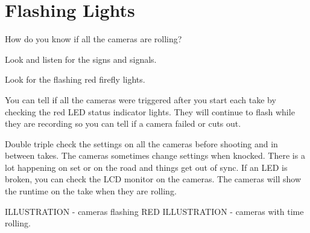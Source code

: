 \chapter{Flashing Lights}
\pagecolor{white}
\label{chap:16}
\begin{fullwidth}


\problem

{\large How do you know if all the cameras are rolling?
 \par}

Look and listen for the signs and signals. 


\solution

{\large Look for the flashing red firefly lights. 


 \par}

You can tell if all the cameras were triggered after you start each take by checking the red LED status indicator lights. They will continue to flash while they are recording so you can tell if a camera failed or cuts out. 

Double triple check the settings on all the cameras before shooting and in between takes. The cameras sometimes change settings when knocked. There is a lot happening on set or on the road and things get out of sync. If an LED is broken, you can check the LCD monitor on the cameras. The cameras will show the runtime on the take when they are rolling. 

ILLUSTRATION - cameras flashing RED 
ILLUSTRATION - cameras with time rolling. 





\clearpage
\end{fullwidth}
